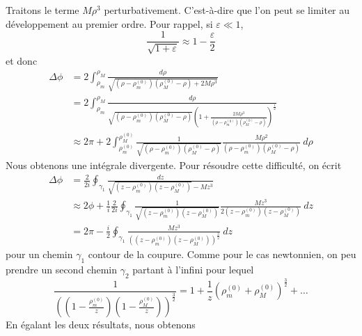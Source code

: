 \documentclass[a4paper,11pt]{report}
\theoremstyle{definition}
\theoremstyle{plain}
\theoremstyle{definition}
\theoremstyle{remark}
\begin{document}
            Traitons le terme $M\rho^3$ perturbativement. C'est-à-dire que l'on peut se limiter au développement au premier ordre. Pour rappel, si $\varepsilon\ll1$,
            \begin{equation}
                \frac{1}{\sqrt{1+\varepsilon}}\approx1-\frac{\varepsilon}{2}
            \end{equation}
            et donc
            \begin{align}
                \Delta\phi &= 2\int^{\rho_M}_{\rho_m}\frac{d\rho}{\sqrt{\left( \rho-\rho^{(0)}_m \right)\left( \rho^{(0)}_M-\rho \right)+2M\rho^3}}\\
                &= 2\int^{\rho_M}_{\rho_m}\frac{d\rho}{\sqrt{\left( \rho-\rho^{(0)}_m \right)\left( \rho^{(0)}_M-\rho \right)}\left( 1+\frac{2M\rho^3}{\left( \rho-\rho^{(0)}_m \right)\left( \rho^{(0)}_M-\rho \right)} \right)^{\frac{1}{2}}} \\
                &\approx 2\pi + 2\int^{\rho^{(0)}_M}_{\rho^{(0)}_m}\frac{1}{\sqrt{\left( \rho-\rho^{(0)}_m \right)\left( \rho^{(0)}_M-\rho \right)}}\frac{M\rho^2}{\left( \rho-\rho^{(0)}_m \right)\left( \rho^{(0)}_M-\rho \right)} ~d\rho
            \end{align}
            Nous obtenons une intégrale divergente. Pour résoudre cette difficulté, on écrit
            \begin{align}
                \Delta\phi &= \frac{2}{2i}\oint_{\gamma_1}\frac{dz}{\sqrt{\left( z-\rho^{(0)}_m \right)\left( z-\rho^{(0)}_M \right)}-Mz^3}\\
                &\approx 2\phi+\frac{1}{i}\frac{2}{2i}\oint_{\gamma_1}\frac{1}{\sqrt{\left( z-\rho^{(0)}_m \right)\left( z-\rho^{(0)}_M \right)}}\frac{Mz^3}{2\left( z-\rho^{(0)}_m \right)\left( z-\rho^{(0)}_M \right)}~dz\\
                &= 2\pi-\frac{i}{2}\oint_{\gamma_1}\frac{Mz^3}{\left(\left( z-\rho^{(0)}_m \right)\left( z-\rho^{(0)}_M \right)\right)^{\frac{3}{2}}}~dz
            \end{align}
            pour un chemin $\gamma_1$ contour de la coupure. Comme pour le cas newtonnien, on peu prendre un second chemin $\gamma_2$ partant à l'infini pour lequel
            \begin{equation}
                \frac{1}{\left(\left( 1-\frac{\rho^{(0)}_m}{z} \right)\left( 1-\frac{\rho^{(0)}_M}{z} \right)\right)^{\frac{3}{2}}} = 1+\frac{1}{z}(\rho^{(0)}_m+\rho^{(0)}_M)^{\frac{3}{2}}+\dots
            \end{equation}
            En égalant les deux résultats, nous obtenons
\end{document}
